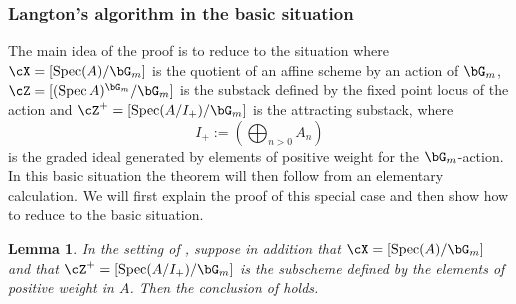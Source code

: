 \documentclass[a4paper]{amsart}
\numberwithin{equation}{section}
\theoremstyle{plain}
\newtheorem{lem}[thm]{Lemma}
\theoremstyle{definition}
\DeclareMathOperator{\Spec}{Spec}
\begin{document}
\subsubsection{Langton's algorithm in the basic situation}
The main idea of the proof is to reduce to the situation where $\cX=[\Spec(A)/\bG_m]$ is  the quotient of an affine scheme by an action of $\bG_m$, $\cZ=[(\Spec A)^{\bG_m}/\bG_m]$ is the substack defined by the fixed point locus of the action and $\cZ^+=[\Spec (A/I_{+}) /\bG_m]$ is the attracting substack, where
\[
I_+ := (\bigoplus_{n>0} A_n)
\]
is the graded ideal generated by elements of positive weight {for the $\bG_m$-action}. In this basic situation the theorem will then follow from an elementary calculation. We will first explain the proof of this special case and then show how to reduce to the basic situation.

\begin{lem}\label{L:graded_affine_reduction}
In the setting of , suppose in addition that $\cX=[\Spec(A)/\bG_m]$ and that $\cZ^+=[\Spec(A/I_+)/\bG_m]$ {is the subscheme defined by the elements of positive weight in $A$}. Then the conclusion of  holds. 
\end{lem}
\end{document}
